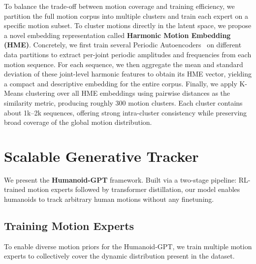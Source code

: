 \documentclass{llmxive}
\providecommand{\methodname}{Humanoid-GPT\xspace}
\begin{document}
To balance the trade-off between motion coverage and training efficiency, we partition the full motion corpus into multiple clusters and train each expert on a specific motion subset. To cluster motions directly in the latent space, we propose a novel embedding representation called \textbf{Harmonic Motion Embedding (HME)}. Concretely, we first train several Periodic Autoencoders~\cite{pae22} on different data partitions to extract per-joint periodic amplitudes and frequencies from each motion sequence. For each sequence, we then aggregate the mean and standard deviation of these joint-level harmonic features to obtain its HME vector, yielding a compact and descriptive embedding for the entire corpus. Finally, we apply K-Means clustering over all HME embeddings using pairwise distances as the similarity metric, producing roughly 300 motion clusters. Each cluster contains about 1k–2k sequences, offering strong intra-cluster consistency while preserving broad coverage of the global motion distribution.


\section{Scalable Generative Tracker}

We present the \textbf{\methodname} framework. Built via a two-stage pipeline: RL-trained motion experts followed by transformer distillation, our model enables humanoids to track arbitrary human motions without any finetuning.

\subsection{Training Motion Experts}
To enable diverse motion priors for the \methodname, we train multiple motion experts to collectively cover the dynamic distribution present in the dataset. 
\end{document}
